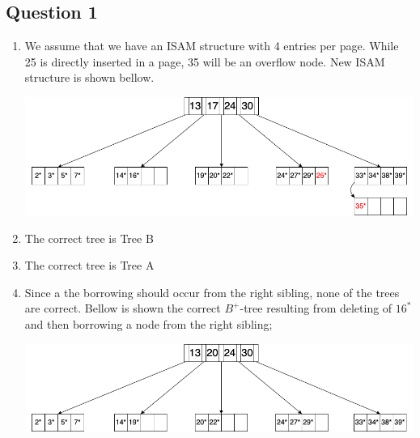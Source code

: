 \newpage
\subsection*{Question 1}

\begin{enumerate}[label={(\alph*)}]
    \item We assume that we have an ISAM structure with 4 entries per page. While 25 is directly inserted in a page, 35 will be an overflow node. New ISAM structure is shown bellow. 
    
        \begin{center}
        \includegraphics[width=1\textwidth]{img/img1.png}
        \end{center}
        
    \item The correct tree is Tree B
    
    \item The correct tree is Tree A
    
    \item Since a the borrowing should occur from the right sibling, none of the trees are correct. Bellow is shown the correct $B^+$-tree resulting from deleting of $16^*$ and then borrowing a node from the right sibling;
        \begin{center}
            \includegraphics[width=1\textwidth]{img/img4.png}
        \end{center}
    
\end{enumerate}